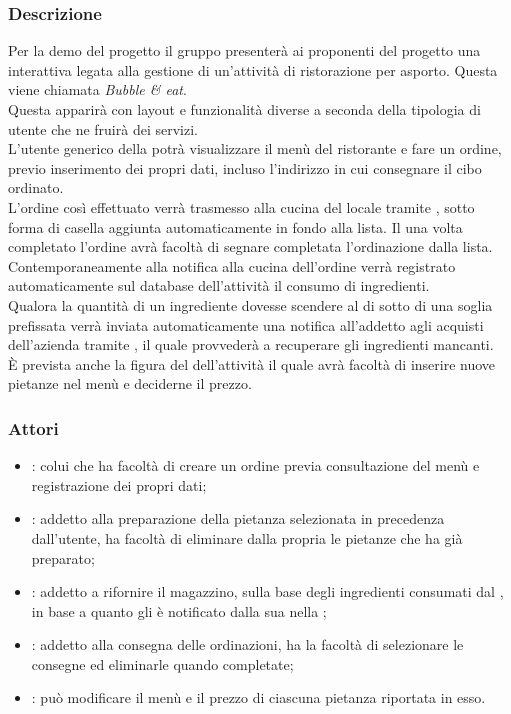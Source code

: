 \subsubsection{Descrizione}
Per la demo del progetto il gruppo \GroupName presenterà ai proponenti del progetto una  interattiva legata alla gestione di un'attività di ristorazione per asporto. Questa  viene chiamata \textit{Bubble \& eat}.
\\Questa {} apparirà con layout e funzionalità diverse a seconda della tipologia di utente che ne fruirà dei servizi.
\\L'utente generico della  potrà visualizzare il menù del ristorante e fare un ordine, previo inserimento dei propri dati, incluso l'indirizzo in cui consegnare il cibo ordinato.
\\L'ordine così effettuato verrà trasmesso alla cucina del locale tramite  , sotto forma di casella aggiunta automaticamente in fondo alla lista. Il  una volta completato l'ordine avrà facoltà di segnare completata l'ordinazione dalla lista.
\\Contemporaneamente alla notifica alla cucina dell'ordine verrà registrato automaticamente sul database dell'attività il consumo di ingredienti.
\\Qualora la quantità di un ingrediente dovesse scendere al di sotto di una soglia prefissata verrà inviata automaticamente una notifica all'addetto agli acquisti dell'azienda tramite , il quale provvederà a recuperare gli ingredienti mancanti.
\\È prevista anche la figura del  dell'attività il quale avrà facoltà di inserire nuove pietanze nel menù e deciderne il prezzo.

\subsubsection{Attori}
\begin{itemize}
	\item {}: colui che ha facoltà di creare un ordine previa consultazione del menù e registrazione dei propri dati;
	\item {}: addetto alla preparazione della pietanza selezionata in precedenza dall'utente, ha facoltà di eliminare dalla propria  le pietanze che ha già preparato;
	\item {}: addetto a rifornire il magazzino, sulla base degli ingredienti consumati dal , in base a quanto gli è notificato dalla sua  nella ;
	\item {}: addetto alla consegna delle ordinazioni, ha la facoltà di selezionare le consegne ed eliminarle quando completate;
	\item {}: può modificare il menù e il prezzo di ciascuna pietanza riportata in esso.
\end{itemize}

